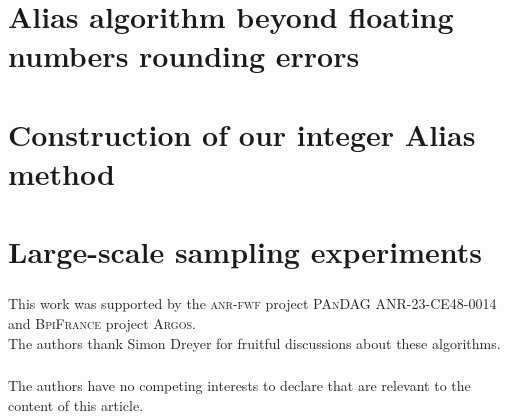 \documentclass[runningheads]{llncs}
\begin{document}


\section{Alias algorithm beyond floating numbers rounding errors}
\label{sec:walker}




\section{Construction of our integer Alias method}
\label{sec:algo}









\section{Large-scale sampling experiments}
\label{sec:exp}




\newpage

\begin{credits}
\subsubsection{\ackname} This work
	was supported by the \textsc{anr-fwf} project \textsc{PAnDAG} ANR-23-CE48-0014 and \textsc{BpiFrance}
	project \textsc{Argos}.\\
	
	The authors thank Simon Dreyer for fruitful discussions about these algorithms.

\subsubsection{\discintname}
The authors have no competing interests to declare that are relevant to the content of this article.
\end{credits}




{\raggedright %
}




% 
\end{document}
